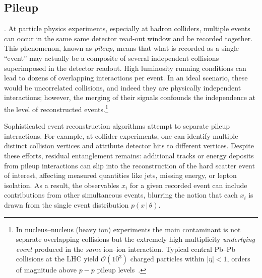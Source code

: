     \subsection{Pileup}.
        At particle physics experiments, especially at hadron colliders, multiple events can occur in the same same detector read-out window and be recorded together.
        This phenomenon, known as \emph{pileup}, means that what is recorded as a single ``event'' may actually be a composite of several independent collisions superimposed in the detector readout.
        High luminosity running conditions can lead to dozens of overlapping interactions per event.
        In an ideal scenario, these would be uncorrelated collisions, and indeed they are physically independent interactions; however, the merging of their signals confounds the independence at the level of reconstructed events.\footnote{
        In nucleus--nucleus (heavy ion) experiments the main contaminant is not separate overlapping collisions but the extremely high multiplicity
        \emph{underlying event} produced in the \emph{same} ion--ion interaction.
        Typical central Pb--Pb collisions at the LHC yield $\mathcal{O}(10^{3})$ charged
        particles within $|\eta|<1$, orders of magnitude above $p-p$ pileup levels~\cite{CMS:2006myw, ALICE:2012nbx}.}
        
        Sophisticated event reconstruction algorithms attempt to separate pileup interactions.
        For example, at collider experiments, one can identify multiple distinct collision vertices and attribute detector hits to different vertices.
        Despite these efforts, residual entanglement remains: additional tracks or energy deposits from pileup interactions can slip into the reconstruction of the hard scatter event of interest, affecting measured quantities like jets, missing energy, or lepton isolation.
        As a result, the observables $x_i$ for a given recorded event can include contributions from other simultaneous events, blurring the notion that each $x_i$ is drawn from the single event distribution $p(x\,|\,\theta)$.
        
